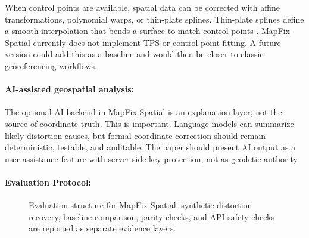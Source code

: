 \documentclass{article}
\begin{document}
When control points are available, spatial data can be corrected with affine transformations, polynomial warps, or thin-plate splines. Thin-plate splines define a smooth interpolation that bends a surface to match control points \citep{bookstein1989principal}. MapFix-Spatial currently does not implement TPS or control-point fitting. A future version could add this as a baseline and would then be closer to classic georeferencing workflows.

\paragraph{AI-assisted geospatial analysis:}

The optional AI backend in MapFix-Spatial is an explanation layer, not the source of coordinate truth. This is important. Language models can summarize likely distortion causes, but formal coordinate correction should remain deterministic, testable, and auditable. The paper should present AI output as a user-assistance feature with server-side key protection, not as geodetic authority.

\paragraph{Evaluation Protocol:}

\begin{figure}[t]
\centering
{}
\caption{Evaluation structure for MapFix-Spatial: synthetic distortion recovery, baseline comparison, parity checks, and API-safety checks are reported as separate evidence layers.}
\label{fig:mapfix-eval}
\end{figure}
\end{document}
